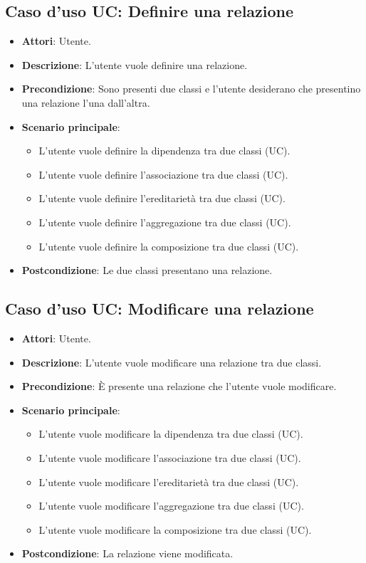 \documentclass[../AnalisiDeiRequisiti.tex]{subfiles}
\begin{document}
		\subsection{Caso d'uso UC: Definire una relazione}
		\begin{itemize}
			\item\textbf{Attori}: Utente.
			\item\textbf{Descrizione}: L'utente vuole definire una relazione.
			\item\textbf{Precondizione}: Sono presenti due classi e l'utente desiderano che presentino una relazione l'una dall'altra.
			\item\textbf{Scenario principale}: 
			\begin{itemize}
				\item L'utente vuole definire la dipendenza tra due classi (UC).
				\item L'utente vuole definire l'associazione tra due classi (UC).
				\item L'utente vuole definire l'ereditarietà tra due classi (UC).
				\item L'utente vuole definire l'aggregazione tra due classi (UC).
				\item L'utente vuole definire la composizione tra due classi (UC).
			\end{itemize}
			\item\textbf{Postcondizione}: Le due classi presentano una relazione.
			
		\end{itemize}
		
		\subsection{Caso d'uso UC: Modificare una relazione}
		\begin{itemize}
			\item\textbf{Attori}: Utente.
			\item\textbf{Descrizione}: L'utente vuole modificare una relazione tra due classi.
			\item\textbf{Precondizione}: È presente una relazione che l'utente vuole modificare.
			\item\textbf{Scenario principale}: 
			\begin{itemize}
				\item L'utente vuole modificare la dipendenza tra due classi (UC).
				\item L'utente vuole modificare l'associazione tra due classi (UC).
				\item L'utente vuole modificare l'ereditarietà tra due classi (UC).
				\item L'utente vuole modificare l'aggregazione tra due classi (UC).
				\item L'utente vuole modificare la composizione tra due classi (UC).
			\end{itemize}
			\item\textbf{Postcondizione}: La relazione viene modificata.
		\end{itemize}
		
\end{document}
